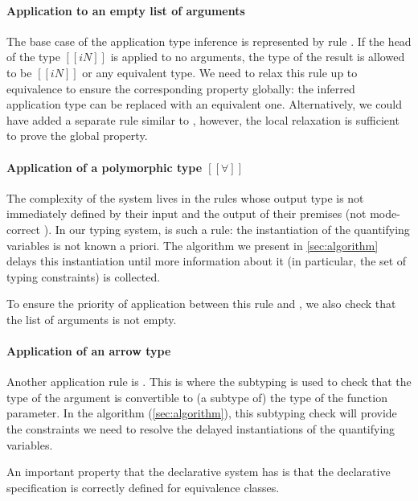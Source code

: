\paragraph*{Application to an empty list of arguments}
  The base case of the application type inference is 
  represented by rule .
  If the head of the type $[[iN]]$ is applied to no arguments, 
  the type of the result is allowed to be $[[iN]]$ or any 
  equivalent type. We need to relax this rule up to equivalence
  to ensure the corresponding property globally:
  the inferred application type can be replaced with an equivalent one.
  Alternatively, we could have added a separate rule similar to 
  , however, 
  the local relaxation is sufficient to prove the global property.

\paragraph*{Application of a polymorphic type $[[∀]]$}
  The complexity of the system lives in the rules whose output type is not
  immediately defined by their input and the output of their premises (\aka not
  mode-correct \cite{dunfield2020:bidirectional}). In our typing system,
   is such a rule: the instantiation of the
  quantifying variables is not known a priori. The algorithm we present in
  \cref{sec:algorithm} delays this instantiation until more information about it
  (in particular, the set of typing constraints) is collected.

  To ensure the priority of application between this rule and 
  , we also check that 
  the list of arguments is not empty.

\paragraph*{Application of an arrow type}
  Another application rule is .
  This is where the subtyping is used to check that the type of the argument
  is convertible to (a subtype of) the type of the function parameter.
  In the algorithm (\cref{sec:algorithm}), this subtyping check will provide the constraints
  we need to resolve the delayed instantiations of the quantifying variables.

  \vspace{\baselineskip}
  An important property that the declarative system has is
  that the declarative specification is correctly defined for
  equivalence classes.

